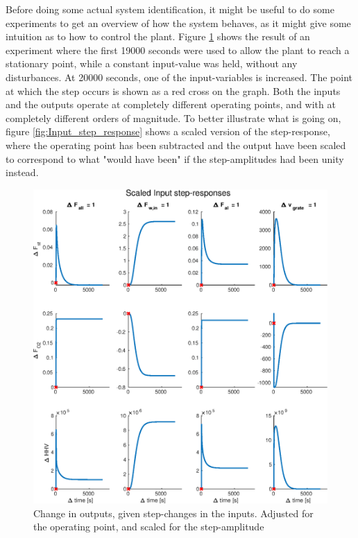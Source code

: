 Before doing some actual system identification, it might be useful to do some experiments to get an overview of how the system behaves, as it might give some intuition as to how to control the plant. Figure \ref{fig:unscaled_Input_step_response} shows the result of an experiment  where the first 19000 seconds were used to allow the plant to reach a stationary point, while a constant input-value was held, without any disturbances. At 20000 seconds, one of the input-variables is increased. The point at which the step occurs is shown as a red cross on the graph. Both the inputs and the outputs operate at completely different operating points, and with at completely different orders of magnitude. To better illustrate what is going on, figure \ref{fig:Input_step_response} shows a scaled version of the step-response, where the operating point has been subtracted and the output have been scaled to correspond to what "would have been" if the step-amplitudes had been unity instead. 

\begin{figure}[!ht]
    \includegraphics[width=\textwidth]{img/Simple_analysis_plots/Scaled_input_step_responses.eps}
    \caption{Change in outputs, given step-changes in the inputs. Adjusted for the operating point, and scaled for the step-amplitude}
    \label{fig:unscaled_Input_step_response}
\end{figure}

